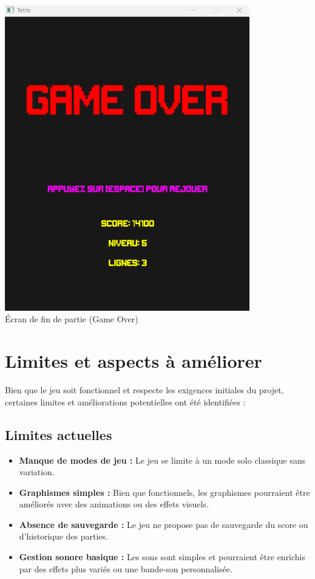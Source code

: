 \documentclass[12pt,a4paper]{report}
\begin{document}
\begin{center}
    \includegraphics[width=0.8\textwidth]{Figure_Game_Over.png}
    \\
    \caption{Écran de fin de partie (Game Over)}
    \label{fig:gameover}
\end{center}


\newpage

\section{Limites et aspects à améliorer}

Bien que le jeu soit fonctionnel et respecte les exigences initiales du projet, certaines limites et améliorations potentielles ont été identifiées :

\subsection{Limites actuelles}
\begin{itemize}
    \item \textbf{Manque de modes de jeu :} Le jeu se limite à un mode solo classique sans variation.
    \item \textbf{Graphismes simples :} Bien que fonctionnels, les graphismes pourraient être améliorés avec des animations ou des effets visuels.
    \item \textbf{Absence de sauvegarde :} Le jeu ne propose pas de sauvegarde du score ou d’historique des parties.
    \item \textbf{Gestion sonore basique :} Les sons sont simples et pourraient être enrichis par des effets plus variés ou une bande-son personnalisée.
\end{itemize}
\end{document}
